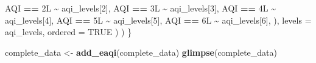 \documentclass[
]{article}
\newenvironment{Shaded}{\begin{snugshade}}{\end{snugshade}}
\newcommand{\AttributeTok}[1]{\textcolor[rgb]{0.13,0.29,0.53}{#1}}
\newcommand{\ConstantTok}[1]{\textcolor[rgb]{0.56,0.35,0.01}{#1}}
\newcommand{\DataTypeTok}[1]{\textcolor[rgb]{0.13,0.29,0.53}{#1}}
\newcommand{\DecValTok}[1]{\textcolor[rgb]{0.00,0.00,0.81}{#1}}
\newcommand{\FunctionTok}[1]{\textcolor[rgb]{0.13,0.29,0.53}{\textbf{#1}}}
\newcommand{\NormalTok}[1]{#1}
\newcommand{\OtherTok}[1]{\textcolor[rgb]{0.56,0.35,0.01}{#1}}
\newcommand{\SpecialCharTok}[1]{\textcolor[rgb]{0.81,0.36,0.00}{\textbf{#1}}}
\begin{document}
\begin{Shaded}
\begin{Highlighting}[]
\NormalTok{          AQI }\SpecialCharTok{==} \DecValTok{2}\DataTypeTok{L} \SpecialCharTok{\textasciitilde{}}\NormalTok{ aqi\_levels[}\DecValTok{2}\NormalTok{],}
\NormalTok{          AQI }\SpecialCharTok{==} \DecValTok{3}\DataTypeTok{L} \SpecialCharTok{\textasciitilde{}}\NormalTok{ aqi\_levels[}\DecValTok{3}\NormalTok{],}
\NormalTok{          AQI }\SpecialCharTok{==} \DecValTok{4}\DataTypeTok{L} \SpecialCharTok{\textasciitilde{}}\NormalTok{ aqi\_levels[}\DecValTok{4}\NormalTok{],}
\NormalTok{          AQI }\SpecialCharTok{==} \DecValTok{5}\DataTypeTok{L} \SpecialCharTok{\textasciitilde{}}\NormalTok{ aqi\_levels[}\DecValTok{5}\NormalTok{],}
\NormalTok{          AQI }\SpecialCharTok{==} \DecValTok{6}\DataTypeTok{L} \SpecialCharTok{\textasciitilde{}}\NormalTok{ aqi\_levels[}\DecValTok{6}\NormalTok{],}
\NormalTok{        ),}
        \AttributeTok{levels =}\NormalTok{ aqi\_levels,}
        \AttributeTok{ordered =} \ConstantTok{TRUE}
\NormalTok{      )}
\NormalTok{    )}
\NormalTok{\}}

\NormalTok{complete\_data }\OtherTok{\textless{}{-}} \FunctionTok{add\_eaqi}\NormalTok{(complete\_data)}
\FunctionTok{glimpse}\NormalTok{(complete\_data)}
\end{Highlighting}
\end{Shaded}
\end{document}
